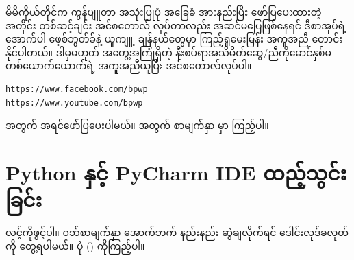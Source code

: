 မိမိကိုယ်တိုင်က ကွန်ပျူတာ အသုံးပြုပုံ အခြေခံ အားနည်းပြီး ဖော်ပြပေးထားတဲ့ အတိုင်း တစ်ဆင့်ချင်း အင်စတောလ် လုပ်တာလည်း အဆင်မပြေဖြစ်နေရင် ဒီစာအုပ်ရဲ့ အောက်ပါ ဖေ့စ်ဘွတ်ခ်နဲ့ ယူကျူ့ ချန်နယ်တွေမှာ ကြည့်ရှုမေးမြန်း အကူအညီ တောင်းနိုင်ပါတယ်။ ဒါမှမဟုတ် အတွေ့အကြုံရှိတဲ့ နီးစပ်ရာအသိမိတ်ဆွေ/ညီကိုမောင်နှစ်မ တစ်ယောက်ယောက်ရဲ့ အကူအညီယူပြီး အင်စတောလ်လုပ်ပါ။
%
\begin{verbatim}
https://www.facebook.com/bpwp
https://www.youtube.com/bpwp
\end{verbatim}
%
 အတွက် အရင်ဖော်ပြပေးပါမယ်။  အတွက် စာမျက်နှာ \fRefNo{\pageref{sec:vscode}} မှာ ကြည့်ပါ။

\section*{Python နှင့် PyCharm IDE ထည့်သွင်းခြင်း}

 လင့်ကိုဖွင့်ပါ။ ဝဘ်စာမျက်နှာ အောက်ဘက် နည်းနည်း ဆွဲချလိုက်ရင်  ဒေါင်းလုဒ်ခလုတ်ကို တွေ့ရပါမယ်။ ပုံ (\fRefNo{\ref{fig:pychmhome}}) ကိုကြည့်ပါ။
\setcounter{figure}{0}
\begin{figure}[tbh!]
\caption{} 
\label{fig:pychmhome}
\end{figure}

